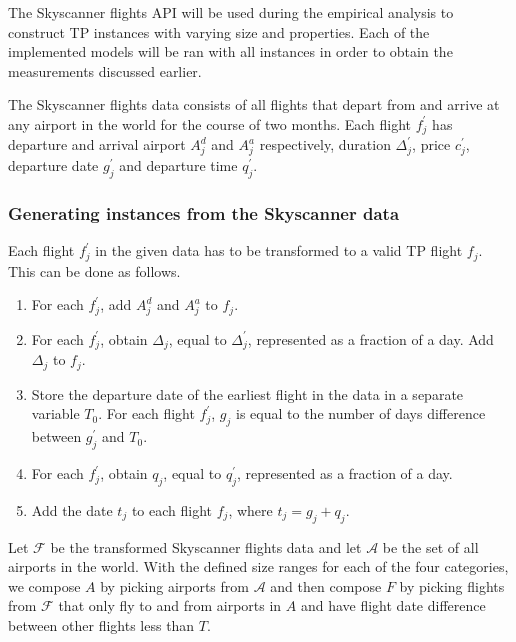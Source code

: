 \documentclass{mprop}
\theoremstyle{definition}
\begin{document}
The Skyscanner flights API will be used during the empirical analysis to construct TP instances with varying size and properties. Each of the implemented models will be ran with all instances in order to obtain the measurements discussed earlier.

The Skyscanner flights data consists of all flights that depart from and arrive at any airport in the world for the course of two months. Each flight $f^{\prime}_{j}$ has departure and arrival airport $A^{d}_{j}$ and $A^{a}_{j}$ respectively, duration $\Delta^{\prime}_{j}$, price $c^{\prime}_{j}$, departure date $g^{\prime}_{j}$ and departure time $q^{\prime}_{j}$.

\subsubsection*{Generating instances from the Skyscanner data}
Each flight $f^{\prime}_{j}$ in the given data has to be transformed to a valid TP flight $f_{j}$. This can be done as follows.

\begin{enumerate}
\item For each $f^{\prime}_{j}$, add $A^{d}_{j}$ and $A^{a}_{j}$ to $f_{j}$.
\item For each $f^{\prime}_{j}$, obtain $\Delta_{j}$, equal to $\Delta^{\prime}_{j}$, represented as a fraction of a day. Add $\Delta_{j}$ to $f_{j}$.
\item %
Store the departure date of the earliest flight in the data in a separate variable $T_{0}$. For each flight $f^{\prime}_{j}$, $g_{j}$ is equal to the number of days difference between $g^{\prime}_{j}$ and $T_{0}$.
\item For each $f^{\prime}_{j}$, obtain $q_{j}$, equal to $q^{\prime}_{j}$, represented as a fraction of a day.
\item Add the date $t_{j}$ to each flight $f_{j}$, where $t_{j} = g_{j} + q_{j}$.
\end{enumerate}

Let $\mathcal{F}$ be the transformed Skyscanner flights data and let $\mathcal{A}$ be the set of all airports in the world. With the defined size ranges for each of the four categories, we compose $A$ by picking airports from $\mathcal{A}$ and then compose $F$ by picking flights from $\mathcal{F}$ that only fly to and from airports in $A$ and have flight date difference between other flights less than $T$.
\end{document}
